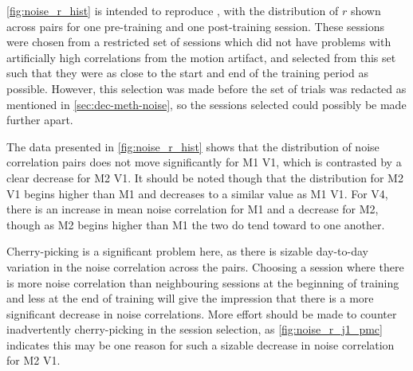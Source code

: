 \autoref{fig:noise_r_hist} is intended to reproduce \citet[Figure 2C]{Gu2011}, with the distribution of $r$ shown across pairs for one pre-training and one post-training session.
These sessions were chosen from a restricted set of sessions which did not have problems with artificially high correlations from the motion artifact, and selected from this set such that they were as close to the start and end of the training period as possible.
However, this selection was made before the set of trials was redacted as mentioned in \autoref{sec:dec-meth-noise}, so the sessions selected could possibly be made further apart.

The data presented in \autoref{fig:noise_r_hist} shows that the distribution of noise correlation pairs does not move significantly for \ac{M1} \ac{V1}, which is contrasted by a clear decrease for \ac{M2} \ac{V1}.
It should be noted though that the distribution for \ac{M2} \ac{V1} begins higher than \ac{M1} and decreases to a similar value as \ac{M1} \ac{V1}.
For \ac{V4}, there is an increase in mean noise correlation for \ac{M1} and a decrease for \ac{M2}, though as \ac{M2} begins higher than \ac{M1} the two do tend toward to one another.

Cherry-picking is a significant problem here, as there is sizable day-to-day variation in the noise correlation across the pairs.
Choosing a session where there is more noise correlation than neighbouring sessions at the beginning of training and less at the end of training will give the impression that there is a more significant decrease in noise correlations.
More effort should be made to counter inadvertently cherry-picking in the session selection, as \autoref{fig:noise_r_j1_pmc} indicates this may be one reason for such a sizable decrease in noise correlation for \ac{M2} \ac{V1}.

